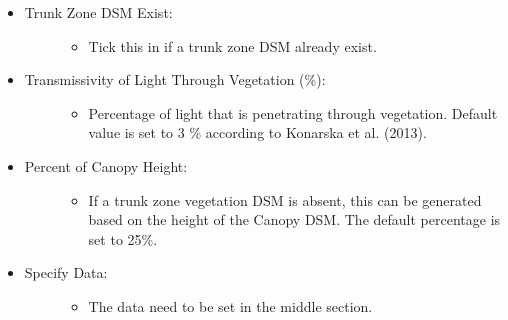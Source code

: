 \documentclass[letterpaper,10pt,english]{sphinxmanual}
\begin{document}
\begin{itemize}
\begin{description}
\end{description}

\item {} \begin{description}
\item[{Trunk Zone DSM Exist:}] \leavevmode\begin{itemize}
\item {} 
Tick this in if a trunk zone DSM already exist.

\end{itemize}

\end{description}

\item {} \begin{description}
\item[{Transmissivity of Light Through Vegetation (\%):}] \leavevmode\begin{itemize}
\item {} 
Percentage of light that is penetrating through vegetation. Default value is set to 3 \% according to Konarska et al. (2013).

\end{itemize}

\end{description}

\item {} \begin{description}
\item[{Percent of Canopy Height:}] \leavevmode\begin{itemize}
\item {} 
If a trunk zone vegetation DSM is absent, this can be generated based on the height of the Canopy DSM. The default percentage is set to 25\%.

\end{itemize}

\end{description}

\item {} \begin{description}
\item[{Specify Data:}] \leavevmode\begin{itemize}
\item {} 
The data need to be set in the middle section.

\end{itemize}

\end{description}


\end{itemize}
\end{document}
